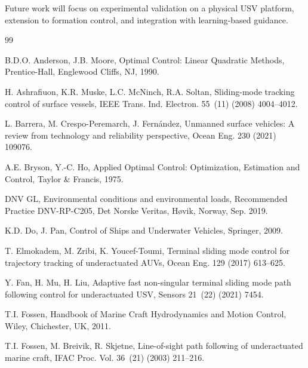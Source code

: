 \documentclass[review]{cas-dc}
\begin{document}
Future work will focus on experimental validation on a physical USV platform, extension to formation control, and integration with learning-based guidance.





\begin{thebibliography}{99}

B.D.O. Anderson, J.B. Moore, Optimal Control: Linear Quadratic Methods, Prentice-Hall, Englewood Cliffs, NJ, 1990.

H. Ashrafiuon, K.R. Muske, L.C. McNinch, R.A. Soltan, Sliding-mode tracking control of surface vessels, IEEE Trans. Ind. Electron. 55~(11) (2008) 4004--4012.

L. Barrera, M. Crespo-Peremarch, J. Fern\'andez, Unmanned surface vehicles: A review from technology and reliability perspective, Ocean Eng. 230 (2021) 109076.

A.E. Bryson, Y.-C. Ho, Applied Optimal Control: Optimization, Estimation and Control, Taylor \& Francis, 1975.

DNV GL, Environmental conditions and environmental loads, Recommended Practice DNV-RP-C205, Det Norske Veritas, H{\o}vik, Norway, Sep. 2019.

K.D. Do, J. Pan, Control of Ships and Underwater Vehicles, Springer, 2009.

T. Elmokadem, M. Zribi, K. Youcef-Toumi, Terminal sliding mode control for trajectory tracking of underactuated AUVs, Ocean Eng. 129 (2017) 613--625.

Y. Fan, H. Mu, H. Liu, Adaptive fast non-singular terminal sliding mode path following control for underactuated USV, Sensors 21~(22) (2021) 7454.

T.I. Fossen, Handbook of Marine Craft Hydrodynamics and Motion Control, Wiley, Chichester, UK, 2011.

T.I. Fossen, M. Breivik, R. Skjetne, Line-of-sight path following of underactuated marine craft, IFAC Proc. Vol. 36~(21) (2003) 211--216.


\end{thebibliography}
\end{document}
